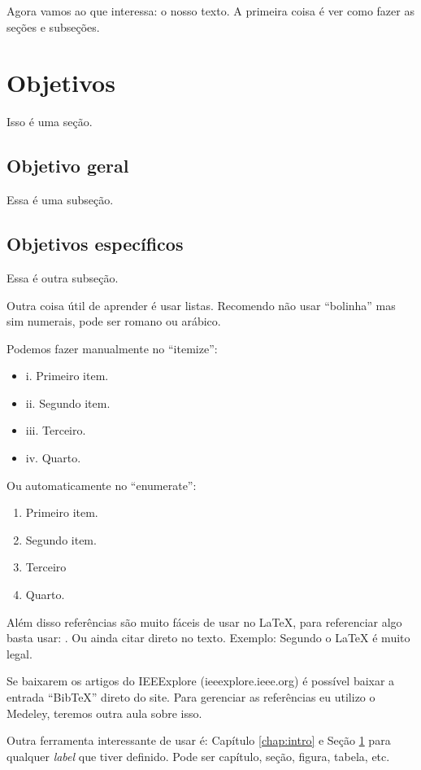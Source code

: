 \documentclass[
	12pt,				%
	openright,			%
	oneside,			%
	a4paper,			%
	chapter=TITLE,		%
	section=TITLE,		%
	subsection=TITLE,	%
	subsubsection=TITLE,%
    subsubsubsection=TITLE,%
	english,			%
    french,
    spanish,
	brazil				%
	]{utfprtex2}
\begin{document}
Agora vamos ao que interessa: o nosso texto. A primeira coisa é ver como fazer as seções e subseções.

\section{Objetivos}
\label{sec:objetivos}

Isso é uma seção.

\subsection{Objetivo geral}

Essa é uma subseção.

\subsection{Objetivos específicos}

Essa é outra subseção.


Outra coisa útil de aprender é usar listas. Recomendo não usar ``bolinha'' mas sim numerais, pode ser romano ou arábico.

Podemos fazer manualmente no ``itemize'':
\begin {itemize}
    \item [i.] Primeiro item.
    \item [ii.] Segundo item.
    \item [iii.] Terceiro.
    \item [iv.] Quarto.
\end{itemize}

Ou automaticamente no ``enumerate'':
\begin{enumerate}
	\item Primeiro item.
	\item Segundo item.
	\item Terceiro
	\item Quarto.
\end{enumerate}	

Além disso referências são muito fáceis de usar no LaTeX, para referenciar algo basta usar: \cite{Owen1998, NormaIEEE2014}. Ou ainda citar direto no texto. Exemplo: Segundo  o LaTeX é muito legal.

Se baixarem os artigos do IEEExplore (ieeexplore.ieee.org) é possível baixar a entrada ``BibTeX'' direto do site. Para gerenciar as referências eu utilizo o Medeley, teremos outra aula sobre isso.

Outra ferramenta interessante de usar é: Capítulo \ref{chap:intro} e Seção \ref{sec:objetivos} para qualquer \textit{label} que tiver definido. Pode ser capítulo, seção, figura, tabela, etc.
\end{document}
